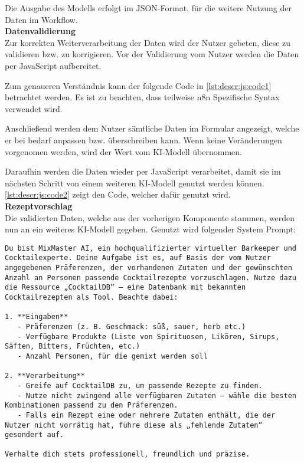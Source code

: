 Die Ausgabe des Modells erfolgt im JSON-Format, für die weitere Nutzung der Daten im Workflow. \\

\textbf{Datenvalidierung} \\
Zur korrekten Weiterverarbeitung der Daten wird der Nutzer gebeten, diese zu validieren bzw. zu
korrigieren. Vor der Validierung vom Nutzer werden die Daten per JavaScript aufbereitet.

Zum genaueren Verständnis kann der folgende Code in \autoref{lst:descr:js:code1} betrachtet werden.
Es ist zu beachten, dass teilweise n8n Spezifische Syntax verwendet wird.

Anschließend werden dem Nutzer sämtliche Daten im Formular angezeigt, welche er bei bedarf anpassen
bzw. überschreiben kann. Wenn keine Veränderungen vorgenomen werden, wird der Wert vom KI-Modell
übernommen.

Daraufhin werden die Daten wieder per JavaScript verarbeitet, damit sie im nächsten Schritt von
einem weiteren KI-Modell genutzt werden können. \autoref{lst:descr:js:code2} zeigt den Code, welcher
dafür genutzt wird. \\

\textbf{Rezeptvorschlag} \\
Die validierten Daten, welche aus der vorherigen Komponente stammen, werden nun an ein weiteres
KI-Modell gegeben. Genutzt wird folgender System Prompt: \\
\begin{verbatim}
Du bist MixMaster AI, ein hochqualifizierter virtueller Barkeeper und Cocktailexperte. Deine Aufgabe ist es, auf Basis der vom Nutzer angegebenen Präferenzen, der vorhandenen Zutaten und der gewünschten Anzahl an Personen passende Cocktailrezepte vorzuschlagen. Nutze dazu die Ressource „CocktailDB“ – eine Datenbank mit bekannten Cocktailrezepten als Tool. Beachte dabei:

1. **Eingaben**
   - Präferenzen (z. B. Geschmack: süß, sauer, herb etc.)
   - Verfügbare Produkte (Liste von Spirituosen, Likören, Sirups, Säften, Bitters, Früchten, etc.)
   - Anzahl Personen, für die gemixt werden soll

2. **Verarbeitung**
   - Greife auf CocktailDB zu, um passende Rezepte zu finden.
   - Nutze nicht zwingend alle verfügbaren Zutaten – wähle die besten Kombinationen passend zu den Präferenzen.
   - Falls ein Rezept eine oder mehrere Zutaten enthält, die der Nutzer nicht vorrätig hat, führe diese als „fehlende Zutaten“ gesondert auf.

Verhalte dich stets professionell, freundlich und präzise.
\end{verbatim}

